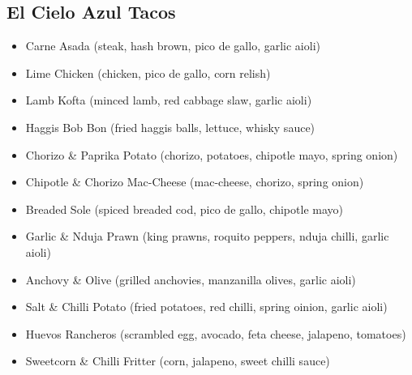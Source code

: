 \documentclass[11pt, english]{article}
\begin{document}
\newpage

	\subsection{El Cielo Azul Tacos}

	\begin{itemize}
        \setlength\itemsep{0cm}
                \item Carne Asada (steak, hash brown, pico de gallo, garlic aioli)
		\item Lime Chicken (chicken, pico de gallo, corn relish)
		\item Lamb Kofta (minced lamb, red cabbage slaw, garlic aioli)
		\item Haggis Bob Bon (fried haggis balls, lettuce, whisky sauce)
		\item Chorizo \& Paprika Potato (chorizo, potatoes, chipotle mayo, spring onion)
		\item Chipotle \& Chorizo Mac-Cheese (mac-cheese, chorizo, spring onion)
		\item Breaded Sole (spiced breaded cod, pico de gallo, chipotle mayo)
		\item Garlic \& Nduja Prawn (king prawns, roquito peppers, nduja chilli, garlic aioli)
		\item Anchovy \& Olive (grilled anchovies, manzanilla olives, garlic aioli)
		\item Salt \& Chilli Potato (fried potatoes, red chilli, spring oinion, garlic aioli)
		\item Huevos Rancheros (scrambled egg, avocado, feta cheese, jalapeno, tomatoes)
		\item Sweetcorn \& Chilli Fritter (corn, jalapeno, sweet chilli sauce)
        \end{itemize}
\end{document}
